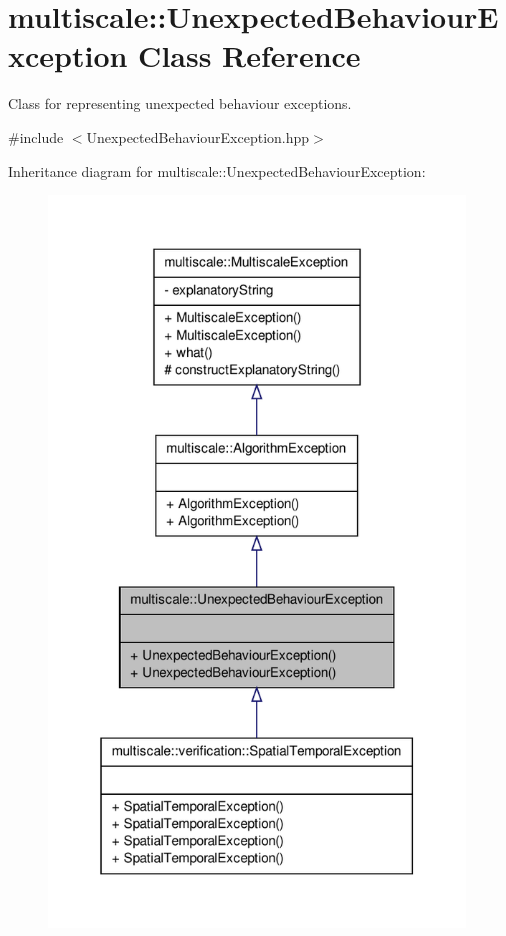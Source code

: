 \hypertarget{classmultiscale_1_1UnexpectedBehaviourException}{\section{multiscale\-:\-:\-Unexpected\-Behaviour\-Exception \-Class \-Reference}
\label{classmultiscale_1_1UnexpectedBehaviourException}
}


\-Class for representing unexpected behaviour exceptions.  




{\ttfamily \#include $<$\-Unexpected\-Behaviour\-Exception.\-hpp$>$}



\-Inheritance diagram for multiscale\-:\-:\-Unexpected\-Behaviour\-Exception\-:
\nopagebreak
\begin{figure}[H]
\begin{center}
\leavevmode
\includegraphics[height=550pt]{classmultiscale_1_1UnexpectedBehaviourException__inherit__graph}
\end{center}
\end{figure}


